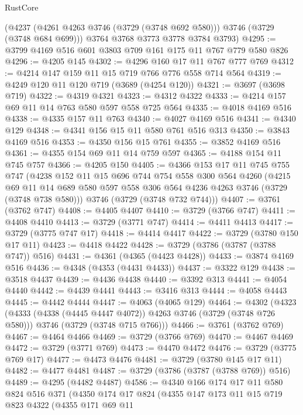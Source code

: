 \begin{lexlean}{RustCore}
\begin{coremodule}
      (@4237 (@4261 @4263 @3746 (@3729 (@3748 @692 @580))) @3746 (@3729 (@3748 @684 @699)))
      @3764
      @3768
      @3773
      @3778
      @3784
      @3793)
@4295 := @3799 @4169 @516 @601 @3803 @709 @161 @175 @11 @767 @779 @580 @826
@4296 := @4205 @145
@4302 := @4296 @160 @17 @11 @767 @777 @769
@4312 := @4214 @147 @159 @11 @15 @719 @766 @776 @558 @714 @564
@4319 := @4249 @120 @11 @120 @719 (@3689 (@4254 @120))
@4321 := @3697 (@3698 @719)
@4322 := @4319 @4321
@4323 := @4312 @4322
@4333 := @4214 @157 @69 @11 @14 @763 @580 @597 @558 @725 @564
@4335 := @4018 @4169 @516
@4338 := @4335 @157 @11 @763
@4340 := @4027 @4169 @516
@4341 := @4340 @129
@4348 := @4341 @156 @15 @11 @580 @761 @516 @313
@4350 := @3843 @4169 @516
@4353 := @4350 @156 @15 @761
@4355 := @3852 @4169 @516
@4361 := @4355 @154 @69 @11 @14 @759 @597
@4365 := @4188 @154 @11 @745 @757
@4366 := @4205 @150
@4405 := @4366
    @153
    @17
    @11
    @745
    @755
    @747
    (@4238
      @152
      @11
      @15
      @696
      @744
      @754
      @558
      @300
      @564
      @4260
      (@4215 @69 @11 @14 @689 @580 @597 @558 @306 @564 @4236 @4263 @3746 (@3729 (@3748 @738 @580)))
      @3746
      (@3729 (@3748 @732 @744)))
@4407 := @3761 (@3762 @747)
@4408 := @4405 @4407
@4410 := @3729 (@3766 @747)
@4411 := @4408 @4410
@4413 := @3729 (@3771 @747)
@4414 := @4411 @4413
@4417 := @3729 (@3775 @747 @17)
@4418 := @4414 @4417
@4422 := @3729 (@3780 @150 @17 @11)
@4423 := @4418 @4422
@4428 := @3729 (@3786 (@3787 (@3788 @747)) @516)
@4431 := @4361 (@4365 (@4423 @4428))
@4433 := @3874 @4169 @516
@4436 := @4348 (@4353 (@4431 @4433))
@4437 := @3322 @129
@4438 := @3518 @4437
@4439 := @4436 @4438
@4440 := @3392 @313
@4441 := @4054 @4440
@4442 := @4439 @4441
@4443 := @3416 @313
@4444 := @4058 @4443
@4445 := @4442 @4444
@4447 := @4063 (@4065 @129)
@4464 := @4302
    (@4323
      (@4333 (@4338 (@4445 @4447 @4072)) @4263 @3746 (@3729 (@3748 @726 @580)))
      @3746
      (@3729 (@3748 @715 @766)))
@4466 := @3761 (@3762 @769)
@4467 := @4464 @4466
@4469 := @3729 (@3766 @769)
@4470 := @4467 @4469
@4472 := @3729 (@3771 @769)
@4473 := @4470 @4472
@4476 := @3729 (@3775 @769 @17)
@4477 := @4473 @4476
@4481 := @3729 (@3780 @145 @17 @11)
@4482 := @4477 @4481
@4487 := @3729 (@3786 (@3787 (@3788 @769)) @516)
@4489 := @4295 (@4482 @4487)
@4586 := @4340
    @166
    @174
    @17
    @11
    @580
    @824
    @516
    @371
    (@4350
      @174
      @17
      @824
      (@4355
        @147
        @173
        @11
        @15
        @719
        @823
        @4322
        (@4355
          @171
          @69
          @11

\end{coremodule}
\end{lexlean}

